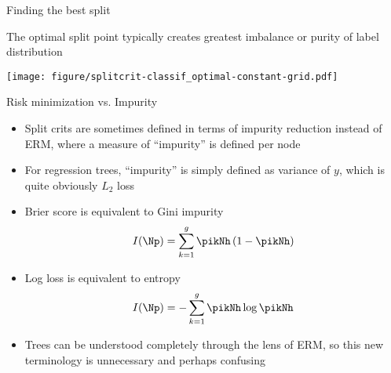 \documentclass[11pt,compress,t,notes=noshow, xcolor=table]{beamer}
\begin{document}
\begin{frame}[b,noframenumbering]{Finding the best split}

The optimal split point typically creates greatest imbalance or purity of label distribution



\vspace{0.5cm}

  \texttt{[image: figure/splitcrit-classif\_optimal-constant-grid.pdf]}
\end{frame}

\begin{vbframe}{Risk minimization vs. Impurity}

\begin{itemize}
\item Split crits are sometimes defined in terms of impurity reduction instead of ERM, where a measure of ``impurity'' is defined per node
\item For regression trees, \enquote{impurity} is simply defined as variance of $y$, which is quite obviously $L_2$ loss

\item Brier score is equivalent to Gini impurity
$$I(\Np) = \sumkg \pikNh \left( 1-\pikNh \right)$$
\item Log loss is equivalent to entropy
$$I(\Np) = -\sumkg \pikNh \log \pikNh$$
\item Trees can be understood completely through the lens of ERM, so this new terminology is unnecessary and perhaps confusing
\end{itemize}
\end{vbframe}
\end{document}
